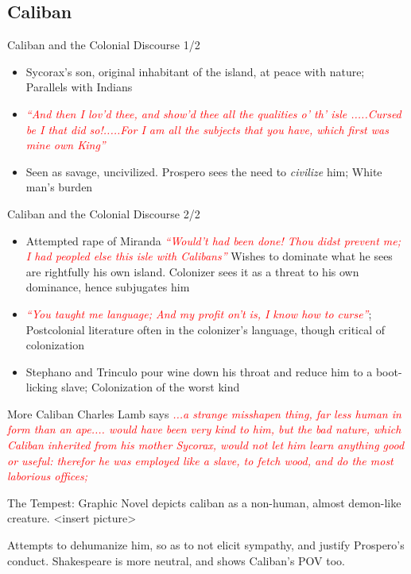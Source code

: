 \documentclass{beamer}
\begin{document}
\subsection{Caliban}
  \begin{frame}{Caliban and the Colonial Discourse 1/2}
    \begin{itemize}
    \item Sycorax's son, original inhabitant of the island, at peace with nature; Parallels with Indians
    \item \textcolor{red}{\emph{``And then I lov'd thee, and show'd thee all the qualities o' th' isle .....Cursed be I that did so!.....For I am all the subjects that you have, which first was mine own King''}}
    \item Seen as savage, uncivilized. Prospero sees the need to \emph{civilize} him; White man's burden
    \end{itemize}
  \end{frame}
  \begin{frame}{Caliban and the Colonial Discourse 2/2}
    \begin{itemize}
    \item Attempted rape of Miranda \textcolor{red}{\emph{``Would't had been done! Thou didst prevent me; I had peopled else this isle with Calibans''}} Wishes to dominate what he sees are rightfully his own island. Colonizer sees it as a threat to his own dominance, hence subjugates him
    \item \textcolor{red}{\emph{``You taught me language; And my profit on't is, I know how to curse''}}; Postcolonial literature often in the colonizer's language, though critical of colonization
    \item Stephano and Trinculo pour wine down his throat and reduce him to a boot-licking slave; Colonization of the worst kind
    \end{itemize}
  \end{frame}

  \begin{frame}{More Caliban}
      Charles Lamb says \textcolor{red}{\emph{...a strange misshapen thing, far less human in form than an ape.... would have been very kind to him, but the bad nature, which Caliban inherited from his mother Sycorax, would not let him learn anything good or useful: therefor he was employed like a slave, to fetch wood, and do the most laborious offices;}}

        The Tempest: Graphic Novel depicts caliban as a non-human, almost demon-like creature. <insert picture>

        Attempts to dehumanize him, so as to not elicit sympathy, and justify Prospero's conduct. Shakespeare is more neutral, and shows Caliban's POV too.
  \end{frame}
\end{document}
